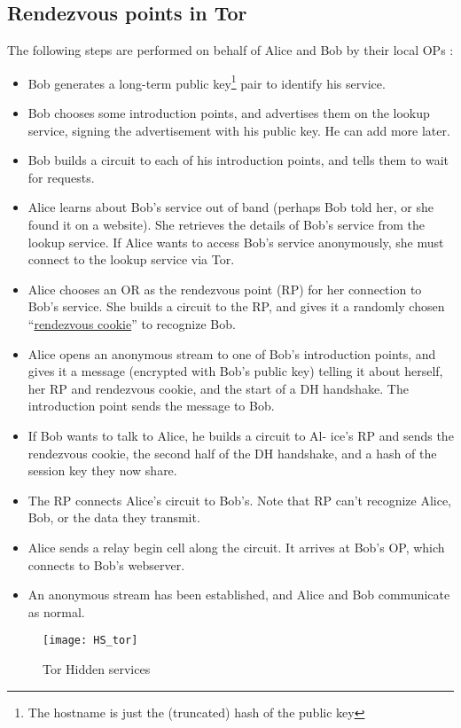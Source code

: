 \subsection{Rendezvous points in Tor}
The following steps are performed on behalf of Alice and Bob by their local OPs \cite{tor_paper} :
\begin{itemize}
	\item Bob generates a long-term public key\footnote{The hostname is just the (truncated) hash of the public key\cite{stackDNS}} pair to identify his service.
	\item Bob chooses some introduction points, and advertises them on the lookup service, signing the advertisement with his public key. He can add more later.
	\item Bob builds a circuit to each of his introduction points, and tells them to wait for requests.
	\item Alice learns about Bob’s service out of band (perhaps Bob told her, or she found it on a website). She retrieves the details of Bob’s service from the lookup service. If Alice wants to access Bob’s service anonymously, she must connect to the lookup service via Tor.
	\item Alice chooses an OR as the rendezvous point (RP) for her connection to Bob’s service. She builds a circuit to the RP, and gives it a randomly chosen “\underline{rendezvous cookie}” to recognize Bob.
	\item Alice opens an anonymous stream to one of Bob’s introduction points, and gives it a message (encrypted with Bob’s public key) telling it about herself, her RP and rendezvous cookie, and the start of a DH handshake. The introduction point sends the message to Bob.
	\item If Bob wants to talk to Alice, he builds a circuit to Al- ice’s RP and sends the rendezvous cookie, the second half of the DH handshake, and a hash of the session key they now share.
	\item The RP connects Alice’s circuit to Bob’s. Note that RP can’t recognize Alice, Bob, or the data they transmit.
	\item Alice sends a relay begin cell along the circuit. It arrives at Bob’s OP, which connects to Bob’s webserver.
	\item An anonymous stream has been established, and Alice and Bob communicate as normal.
\end{itemize}

\begin{figure}[!h]
\centering\texttt{[image: HS\_tor]}
\caption{Tor Hidden services \cite{tor_slideshare}}
\label{fig:HS_tor} %
\end{figure}

